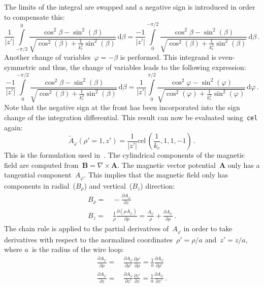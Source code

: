 The limits of the integral are swapped and a negative sign is introduced in order to compensate this:
\begin{equation}
   \frac{1}{|z'|} \int\limits_{-\pi/2}^{0} \frac{\cos^2{\beta} - \sin^2(\beta)}{\sqrt{\cos^2(\beta ) + \frac{1}{k_c^2} \sin^2(\beta)}} \,\mathrm{d}\beta
 = \frac{-1}{|z'|} \int\limits_{0}^{-\pi/2} \frac{\cos^2{\beta} - \sin^2(\beta)}{\sqrt{\cos^2(\beta ) + \frac{1}{k_c^2} \sin^2(\beta)}} \,\mathrm{d}\beta \, .
\end{equation}
Another change of variables~$\varphi = -\beta$ is performed.
This integrand is even-symmetric and thus, the change of variables leads to
the following expression:
\begin{equation}
   \frac{-1}{|z'|} \int\limits_{0}^{-\pi/2} \frac{\cos^2{\beta} - \sin^2(\beta)}{\sqrt{\cos^2(\beta ) + \frac{1}{k_c^2} \sin^2(\beta)}} \,\mathrm{d}\beta
 = \frac{1}{|z'|} \int\limits_{0}^{\pi/2} \frac{\cos^2{\varphi} - \sin^2(\varphi)}{\sqrt{\cos^2(\varphi) + \frac{1}{k_c^2} \sin^2(\varphi)}} \,\mathrm{d}\varphi \, .
\end{equation}
Note that the negative sign at the front has been incorporated into the sign change of the integration differential.
This result can now be evaluated using~\texttt{cel} again:
\begin{equation}
  \tilde{A}_\varphi(\rho'=1,z') = \frac{1}{|z'|} \textrm{cel}\,\left(\frac{1}{k_c}, 1, 1, -1\right) \, .
\end{equation}
This is the formulation used in~.
The cylindrical components of the magnetic field are computed from~$\mathbf{B} = \nabla \times \mathbf{A}$.
The magnetic vector potential~$\mathbf{A}$ only has a tangential component~$A_\varphi$.
This implies that the magnetic field only has components in radial~($B_\rho$) and vertical~($B_z$) direction:
\begin{align}
  B_\rho =&\, - \frac{\partial A_\varphi}{\partial z} \\
  B_z    =&\, \frac{1}{\rho} \frac{\partial \left(\rho A_\varphi\right)}{\partial \rho}
         =    \frac{A_\varphi}{\rho} + \frac{\partial A_\varphi}{\partial \rho} \, .
\end{align}
The chain rule is applied to the partial derivatives of~$A_\varphi$
in order to take derivatives with respect to the normalized coordinates~$\rho'=\rho/a$ and~$z'=z/a$,
where $a$~is the radius of the wire loop:
\begin{align}
      \frac{\partial A_\varphi}{\partial \rho}
 =&\, \frac{\partial A_\varphi}{\partial \rho'} \frac{\partial \rho'}{\partial \rho}
 =    \frac{1}{a} \frac{\partial A_\varphi}{\partial \rho'} \\
      \frac{\partial A_\varphi}{\partial z}
 =&\, \frac{\partial A_\varphi}{\partial z'} \frac{\partial z'}{\partial z}
 =    \frac{1}{a} \frac{\partial A_\varphi}{\partial z'} \, .
\end{align}
